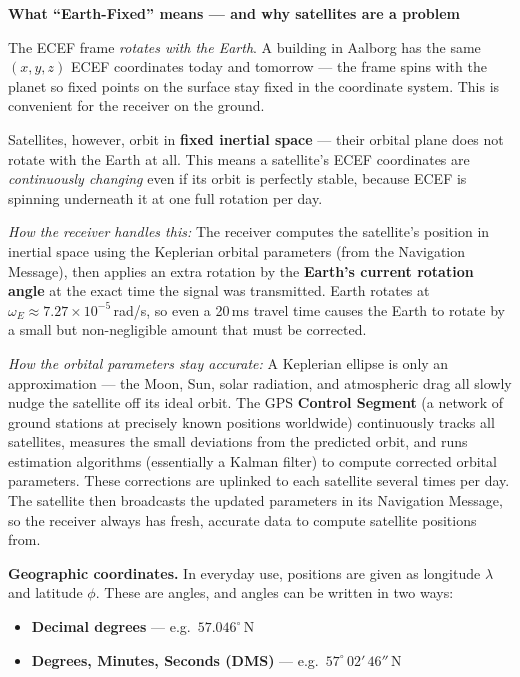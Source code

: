 \documentclass[12pt, a4paper]{article}
\begin{document}
\begin{notebox}
  \textbf{What ``Earth-Fixed'' means --- and why satellites are a problem}

  The ECEF frame \emph{rotates with the Earth}.
  A building in Aalborg has the same $(x, y, z)$ ECEF coordinates
  today and tomorrow --- the frame spins with the planet so fixed
  points on the surface stay fixed in the coordinate system.
  This is convenient for the receiver on the ground.

  Satellites, however, orbit in \textbf{fixed inertial space} --- their
  orbital plane does not rotate with the Earth at all.
  This means a satellite's ECEF coordinates are \emph{continuously
  changing} even if its orbit is perfectly stable, because ECEF is
  spinning underneath it at one full rotation per day.

  \textit{How the receiver handles this:}
  The receiver computes the satellite's position in inertial space using
  the Keplerian orbital parameters (from the Navigation Message), then
  applies an extra rotation by the \textbf{Earth's current rotation
  angle} at the exact time the signal was transmitted.
  Earth rotates at $\omega_E \approx 7.27\times10^{-5}$\,rad/s, so
  even a 20\,ms travel time causes the Earth to rotate by a small but
  non-negligible amount that must be corrected.

  \textit{How the orbital parameters stay accurate:}
  A Keplerian ellipse is only an approximation --- the Moon, Sun, solar
  radiation, and atmospheric drag all slowly nudge the satellite off its
  ideal orbit.
  The GPS \textbf{Control Segment} (a network of ground stations at
  precisely known positions worldwide) continuously tracks all
  satellites, measures the small deviations from the predicted orbit,
  and runs estimation algorithms (essentially a Kalman filter) to
  compute corrected orbital parameters.
  These corrections are uplinked to each satellite several times per
  day.
  The satellite then broadcasts the updated parameters in its Navigation
  Message, so the receiver always has fresh, accurate data to compute
  satellite positions from.
\end{notebox}

\textbf{Geographic coordinates.}
In everyday use, positions are given as longitude $\lambda$ and
latitude $\phi$.
These are angles, and angles can be written in two ways:
\begin{itemize}[leftmargin=1.2em,itemsep=2pt]
  \item \textbf{Decimal degrees} --- e.g.\ $57.046^\circ$\,N
  \item \textbf{Degrees, Minutes, Seconds (DMS)} --- e.g.\
    $57^\circ\,02'\,46''$\,N
\end{itemize}
\end{document}
